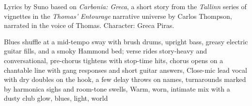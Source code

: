 
\begin{notes}
Lyrics by Suno based on \emph{Carbonia: Greca}, a short story from the \emph{Tallinn} series of vignettes in the \emph{Thomas’ Entourage} narrative universe by Carlos Thompson, narrated in the voice of Thomas. Character: Greca Piras.
\end{notes}
\begin{style}
Blues shuffle at a mid-tempo sway with brush drums, upright bass, greasy electric guitar fills, and a smoky Hammond bed; verse rides story-heavy and conversational, pre-chorus tightens with stop-time hits, chorus opens on a chantable line with gang responses and short guitar answers, Close-mic lead vocal with dry doubles on the hook, a few delay throws on names, turnarounds marked by harmonica sighs and room-tone swells, Warm, worn, intimate mix with a dusty club glow, blues, light, world
\end{style}
